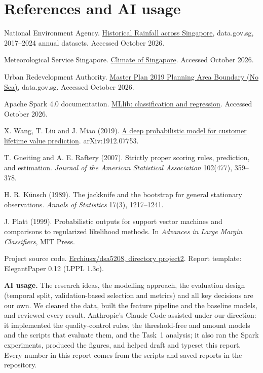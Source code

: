 \documentclass[lang=en,11pt,a4paper,bibend=bibtex]{elegantpaper}
\newcommand{\AIUsage}{The research ideas, the modelling approach, the evaluation design (temporal split, validation-based selection and metrics) and all key decisions are our own. We cleaned the data, built the feature pipeline and the baseline models, and reviewed every result. Anthropic's Claude Code assisted under our direction: it implemented the quality-control rules, the threshold-free and amount models and the scripts that evaluate them, and the Task~1 analysis; it also ran the Spark experiments, produced the figures, and helped draft and typeset this report. Every number in this report comes from the scripts and saved reports in the repository.}
\begin{document}
\section*{References and AI usage}
\begin{enumerate}[label={[\arabic*]},leftmargin=1.8em,itemsep=6pt]
\item\label{ref:1} National Environment Agency. \href{https://data.gov.sg/collections/2279/view}{Historical Rainfall across Singapore}, data.gov.sg, 2017--2024 annual datasets. Accessed October 2026.
\item\label{ref:2} Meteorological Service Singapore. \href{https://www.weather.gov.sg/climate-climate-of-singapore/}{Climate of Singapore}. Accessed October 2026.
\item\label{ref:3} Urban Redevelopment Authority. \href{https://data.gov.sg/datasets/d_4765db0e87b9c86336792efe8a1f7a66/view}{Master Plan 2019 Planning Area Boundary (No Sea)}, data.gov.sg. Accessed October 2026.
\item\label{ref:4} Apache Spark 4.0 documentation. \href{https://spark.apache.org/docs/4.0.1/ml-classification-regression.html}{MLlib: classification and regression}. Accessed October 2026.
\item\label{ref:5} X. Wang, T. Liu and J. Miao (2019). \href{https://arxiv.org/abs/1912.07753}{A deep probabilistic model for customer lifetime value prediction}. arXiv:1912.07753.
\item\label{ref:6} T. Gneiting and A. E. Raftery (2007). Strictly proper scoring rules, prediction, and estimation. \emph{Journal of the American Statistical Association} 102(477), 359--378.
\item\label{ref:7} H. R. Künsch (1989). The jackknife and the bootstrap for general stationary observations. \emph{Annals of Statistics} 17(3), 1217--1241.
\item\label{ref:8} J. Platt (1999). Probabilistic outputs for support vector machines and comparisons to regularized likelihood methods. In \emph{Advances in Large Margin Classifiers}, MIT Press.
\item\label{ref:9} Project source code. \href{https://github.com/Erchiusx/dsa5208/tree/master/project2}{Erchiusx/dsa5208, directory project2}. Report template: ElegantPaper 0.12 (LPPL 1.3c).
\item\label{ref:10} \textbf{AI usage.} \AIUsage
\end{enumerate}
\end{document}
